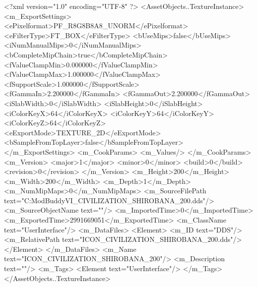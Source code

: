 <?xml version="1.0" encoding="UTF-8" ?>
<AssetObjects..TextureInstance>
	<m_ExportSettings>
		<ePixelformat>PF_R8G8B8A8_UNORM</ePixelformat>
		<eFilterType>FT_BOX</eFilterType>
		<bUseMips>false</bUseMips>
		<iNumManualMips>0</iNumManualMips>
		<bCompleteMipChain>true</bCompleteMipChain>
		<fValueClampMin>0.000000</fValueClampMin>
		<fValueClampMax>1.000000</fValueClampMax>
		<fSupportScale>1.000000</fSupportScale>
		<fGammaIn>2.200000</fGammaIn>
		<fGammaOut>2.200000</fGammaOut>
		<iSlabWidth>0</iSlabWidth>
		<iSlabHeight>0</iSlabHeight>
		<iColorKeyX>64</iColorKeyX>
		<iColorKeyY>64</iColorKeyY>
		<iColorKeyZ>64</iColorKeyZ>
		<eExportMode>TEXTURE_2D</eExportMode>
		<bSampleFromTopLayer>false</bSampleFromTopLayer>
	</m_ExportSettings>
	<m_CookParams>
		<m_Values/>
	</m_CookParams>
	<m_Version>
		<major>1</major>
		<minor>0</minor>
		<build>0</build>
		<revision>0</revision>
	</m_Version>
	<m_Height>200</m_Height>
	<m_Width>200</m_Width>
	<m_Depth>1</m_Depth>
	<m_NumMipMaps>0</m_NumMipMaps>
	<m_SourceFilePath text="C:\Users\asus\Documents\Firaxis ModBuddy\Civilization VI\temppic\ICON_CIVILIZATION_SHIROBANA_200.dds"/>
	<m_SourceObjectName text=""/>
	<m_ImportedTime>0</m_ImportedTime>
	<m_ExportedTime>2991669051</m_ExportedTime>
	<m_ClassName text="UserInterface"/>
	<m_DataFiles>
		<Element>
			<m_ID text="DDS"/>
			<m_RelativePath text="ICON_CIVILIZATION_SHIROBANA_200.dds"/>
		</Element>
	</m_DataFiles>
	<m_Name text="ICON_CIVILIZATION_SHIROBANA_200"/>
	<m_Description text=""/>
	<m_Tags>
		<Element text="UserInterface"/>
	</m_Tags>
</AssetObjects..TextureInstance>


